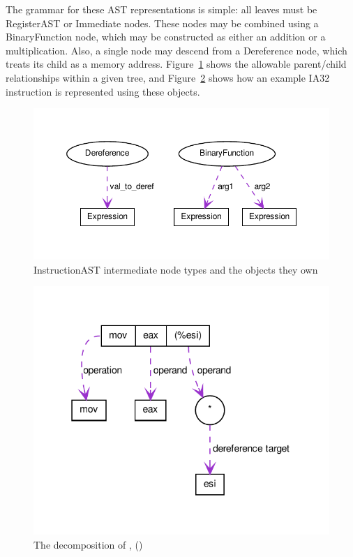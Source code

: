 The grammar for these AST representations is simple: all leaves must be
RegisterAST or Immediate nodes. These nodes may be combined using a
BinaryFunction node, which may be constructed as either an addition or a
multiplication. Also, a single node may descend from a Dereference node, which
treats its child as a memory address. Figure~\ref{fig:ownership} shows the allowable parent/child
relationships within a given tree, and Figure~\ref{fig:representation} shows how an example IA32
instruction is represented using these objects. 

\begin{figure}
\includegraphics{fig/ast_ownership}
\caption{InstructionAST intermediate node types and the objects they own}
\label{fig:ownership}
\end{figure}
 
\begin{figure}
\includegraphics{fig/instruction_representation}
\caption{The decomposition of  , ()}
\label{fig:representation}
\end{figure}

